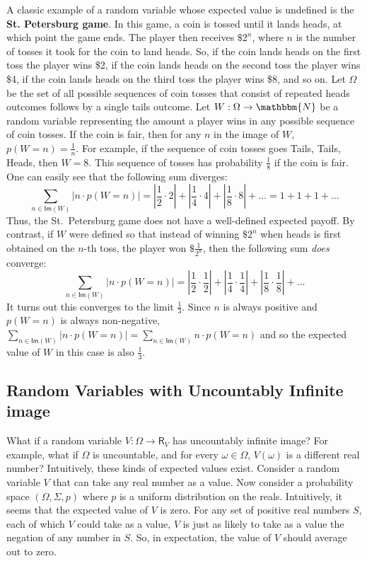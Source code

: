 \documentclass[11pt]{article}
\theoremstyle{definition}
\theoremstyle{remark}
\begin{document}
A classic example of a random variable whose expected value is undefined is the \textbf{St. Petersburg game}. In this game, a coin is tossed until it lands heads, at which point the game ends. The player then receives $\$2^{n}$, where $n$ is the number of tosses it took for the coin to land heads. So, if the coin lands heads on the first toss the player wins \$2, if the coin lands heads on the second toss the player wins \$4, if the coin lands heads on the third toss the player wins \$8, and so on. Let $\Omega$ be the set of all possible sequences of coin tosses that consist of repeated heads outcomes follows by a single tails outcome. Let $W:\Omega\rightarrow\mathbbm{N}$ be a random variable representing the amount a player wins in any possible sequence of coin tosses. If the coin is fair, then for any $n$ in the image of $W$, $p(W=n)=\frac{1}{n}$. For example, if the sequence of coin tosses goes Tails, Tails, Heads, then $W=8$. This sequence of tosses has probability $\frac{1}{8}$ if the coin is fair. One can easily see that the following sum diverges:
$$\sum_{n\in\textsf{Im}(W)}|n\cdot p(W=n)| = |\frac{1}{2}\cdot 2| + |\frac{1}{4}\cdot 4| + |\frac{1}{8}\cdot 8|  + \dots = 1 + 1 + 1 + \dots$$
Thus, the St.\ Petersburg game does not have a well-defined expected payoff. By contrast, if $W$ were defined so that instead of winning $\$2^{n}$ when heads is first obtained on the $n$-th toss, the player won $\$\frac{1}{2^{n}}$, then the following sum \textit{does} converge:
$$\sum_{n\in\textsf{Im}(W)}|n\cdot p(W=n)| = |\frac{1}{2}\cdot \frac{1}{2}| + |\frac{1}{4}\cdot \frac{1}{4}| + |\frac{1}{8}\cdot \frac{1}{8}|  + \dots$$
It turns out this converges to the limit $\frac{1}{3}$. Since $n$ is always positive and $p(W=n)$ is always non-negative, $\sum_{n\in\textsf{Im}(W)}|n\cdot p(W=n)|=\sum_{n\in\textsf{Im}(W)}n\cdot p(W=n)$ and so the expected value of $W$ in this case is also $\frac{1}{3}$.

\subsection{Random Variables with Uncountably Infinite image}\label{subsec:uncount}
What if a random variable $V:\Omega\rightarrow\textsf{R}_{V}$ has uncountably infinite image? For example, what if $\Omega$ is uncountable, and for every $\omega\in\Omega$, $V(\omega)$ is a different real number? Intuitively, these kinds of expected values exist. Consider a random variable $V$ that can take any real number as a value. Now consider a probability space $(\Omega,\Sigma,p)$ where $p$ is a uniform distribution on the reals. Intuitively, it seems that the expected value of $V$ is zero. For any set of positive real numbers $S$, each of which $V$ could take as a value, $V$ is just as likely to take as a value the negation of any number in $S$. So, in expectation, the value of $V$ should average out to zero.\par 
\end{document}
